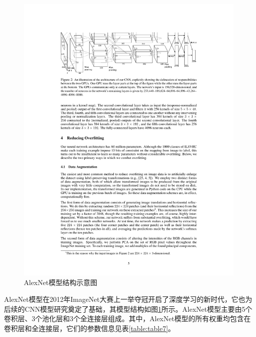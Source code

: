 \begin{figure}[htbp]
    \centering
    \includegraphics[width=1.0\textwidth]{figures/alexnet.pdf}
    \caption{AlexNet模型结构示意图 \cite{krizhevsky2012imagenet}}\label{figure:figure17}
\end{figure}

AlexNet模型在2012年ImageNet大赛上一举夺冠开启了深度学习的新时代，它也为后续的CNN模型研究奠定了基础，其模型结构如图\ref{figure:figure17}所示。AlexNet模型主要由5个卷积层、3个池化层和3个全连接层组成。其中，AlexNet模型的所有权重均包含在卷积层和全连接层，它们的参数信息见表\ref{table:table7}。

